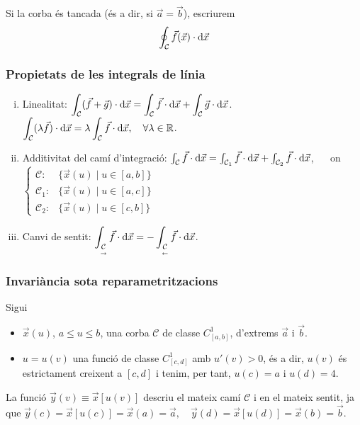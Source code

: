 Si la corba és tancada (és a dir, si $\vec{a} = \vec{b}$), escriurem
\begin{align}
    \oint_\mathcal{C} \vec{f} (\vec{x}) \cdot \mathrm{d} \vec{x}
\end{align}

\subsubsection*{Propietats de les integrals de línia}
\begin{enumerate}[i)]
    \item Linealitat:
        \subitem $\displaystyle \int_{\mathcal{C}} (\vec{f} + \vec{g}) \cdot \mathrm{d} \vec{x} = \int_{\mathcal{C}} \vec{f} \cdot \mathrm{d} \vec{x} + \int_{\mathcal{C}} \vec{g} \cdot \mathrm{d} \vec{x}$.
        \subitem $\displaystyle \int_{\mathcal{C}} (\lambda \vec{f}) \cdot \mathrm{d} \vec{x} = \lambda \int_{\mathcal{C}} \vec{f} \cdot \mathrm{d} \vec{x}, \quad \forall \lambda \in \mathbb{R}$.
    \item Additivitat del camí d'integració:
        \subitem $\int_{\mathcal{C}} \vec{f} \cdot \mathrm{d} \vec{x} = \int_{\mathcal{C}_{1}} \vec{f} \cdot \mathrm{d} \vec{x} + \int_{\mathcal{C}_{2}} \vec{f} \cdot \mathrm{d} \vec{x}$, $\quad$ on $\begin{cases}\mathcal{C}: &\{ \vec{x}(u) \mid u \in [a,b] \} \\ \mathcal{C}_{1}: &\{ \vec{x}(u) \mid u \in [a,c] \}\\ \mathcal{C}_{2}: &\{ \vec{x}(u) \mid u \in [c,b] \} \end{cases}$
    \item Canvi de sentit:
        \subitem $\displaystyle \int_{\underset{\to}{\mathcal{C}}} \vec{f} \cdot \mathrm{d} \vec{x} = - \int_{\underset{\leftarrow}{\mathcal{C}}} \vec{f} \cdot \mathrm{d} \vec{x}$.
\end{enumerate}

\subsubsection*{Invariància sota reparametritzacions}
Sigui
\begin{itemize}
    \item $\vec{x}(u)$, $a\leq u \leq b$, una corba $\mathcal{C}$ de classe $C^{1}_{[a,b]}$, d'extrems $\vec{a}$ i $\vec{b}$.
    \item $u = u(v)$ una funció de classe $C^{1}_{[c,d]}$ amb $u'(v) > 0$, és a dir, $u(v)$ és estrictament creixent a $[c,d]$ i tenim, per tant, $u(c) = a$ i $u(d) = 4$.
\end{itemize}
La funció $\vec{y}(v) \equiv \vec{x}[u(v)]$ descriu el mateix camí $\mathcal{C}$ i en el mateix sentit, ja que $\vec{y}(c) = \vec{x}[u(c)] = \vec{x}(a) = \vec{a}, \quad \vec{y}(d) = \vec{x}[u(d)] = \vec{x}(b) = \vec{b}$.

